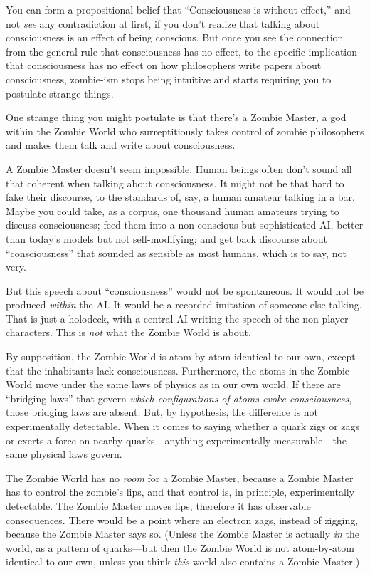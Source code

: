 {
 You can form a propositional belief that
``Consciousness is without effect,''
and not \textit{see} any contradiction at first, if you
don't realize that talking about consciousness is an
effect of being conscious. But once you see the connection from the
general rule that consciousness has no effect, to the specific
implication that consciousness has no effect on how philosophers write
papers about consciousness, zombie-ism stops being intuitive and starts
requiring you to postulate strange things.}

{
 One strange thing you might postulate is that
there's a Zombie Master, a god within the Zombie World
who surreptitiously takes control of zombie philosophers and makes them
talk and write about consciousness.}

{
 A Zombie Master doesn't seem impossible. Human
beings often don't sound all that coherent when talking
about consciousness. It might not be that hard to fake their discourse,
to the standards of, say, a human amateur talking in a bar. Maybe you
could take, as a corpus, one thousand human amateurs trying to discuss
consciousness; feed them into a non-conscious but sophisticated AI,
better than today's models but not self-modifying; and
get back discourse about
``consciousness'' that sounded as
sensible as most humans, which is to say, not very.}

{
 But this speech about
``consciousness'' would not be
spontaneous. It would not be produced \textit{within} the AI. It would
be a recorded imitation of someone else talking. That is just a
holodeck, with a central AI writing the speech of the non-player
characters. This is \textit{not} what the Zombie World is about.}

{
 By supposition, the Zombie World is atom-by-atom identical to our
own, except that the inhabitants lack consciousness. Furthermore, the
atoms in the Zombie World move under the same laws of physics as in our
own world. If there are ``bridging
laws'' that govern \textit{which configurations of
atoms evoke consciousness}, those bridging laws are absent. But, by
hypothesis, the difference is not experimentally detectable. When it
comes to saying whether a quark zigs or zags or exerts a force on
nearby quarks---anything experimentally measurable---the same physical
laws govern.}

{
 The Zombie World has no \textit{room} for a Zombie Master, because
a Zombie Master has to control the zombie's lips, and
that control is, in principle, experimentally detectable. The Zombie
Master moves lips, therefore it has observable consequences. There
would be a point where an electron zags, instead of zigging, because
the Zombie Master says so. (Unless the Zombie Master is actually
\textit{in} the world, as a pattern of quarks---but then the Zombie
World is not atom-by-atom identical to our own, unless you think
\textit{this} world also contains a Zombie Master.)}

